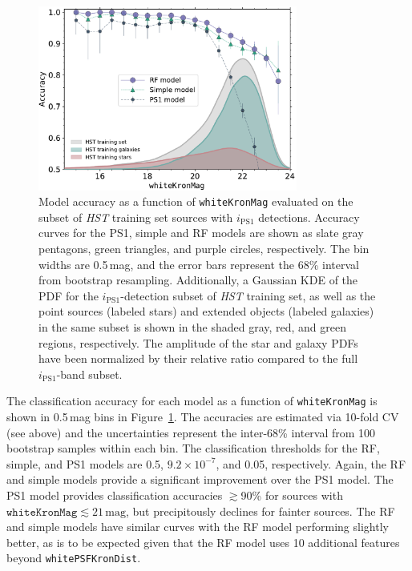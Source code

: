 \documentclass[twocolumn]{aastex62}
\begin{document}
\begin{CJK*}{UTF8}{gbsn}
\begin{figure}[t]
 \centering
  \includegraphics[width=3.35in]{./Figures/CV_Accuracy_HST.pdf}
  \caption{Model accuracy as a function of \texttt{whiteKronMag} evaluated
  on the subset of \textit{HST} training set sources with $i_\mathrm{PS1}$
  detections. Accuracy curves for the PS1, simple and RF models are shown as
  slate gray pentagons, green triangles, and purple circles, respectively.
  The bin widths are 0.5\,mag, and the error bars represent the 68\%
  interval from bootstrap resampling. Additionally, a Gaussian KDE of the
  PDF for the $i_\mathrm{PS1}$-detection subset of \textit{HST} training
  set, as well as the point sources (labeled stars) and extended objects
  (labeled galaxies) in the same subset is shown in the shaded gray, red,
  and green regions, respectively. The amplitude of the star and galaxy PDFs
  have been normalized by their relative ratio compared to the full
  $i_\mathrm{PS1}$-band subset.} 
  \label{fig:cvacc_hst}
\end{figure}

The classification accuracy for each model as a function of
\texttt{whiteKronMag} is shown in 0.5\,mag bins in
Figure~\ref{fig:cvacc_hst}. The accuracies are estimated via 10-fold CV (see
above) and the uncertainties represent the inter-68\% interval from
100 bootstrap samples within each bin. 
The classification thresholds for the RF, simple, and PS1 models are 0.5,
$9.2 \times 10^{-7}$, and 0.05, respectively. Again, the RF and simple
models provide a significant improvement over the PS1 model. The PS1 model
provides classification accuracies $\gtrsim$90\% for sources with
$\mathtt{whiteKronMag} \lesssim 21\,\mathrm{mag}$, but precipitously
declines for fainter sources. The RF and simple models have similar curves
with the RF model performing slightly better, as is to be expected given
that the RF model uses 10 additional features beyond
\texttt{whitePSFKronDist}.


\end{CJK*}
\end{document}
